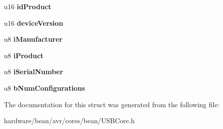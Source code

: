 \begin{DoxyCompactItemize}
\item 
\hypertarget{struct_device_descriptor_addd78b30e7cb9d2f475ba2374f3c9a89}{}u16 {\bfseries id\+Product}\label{struct_device_descriptor_addd78b30e7cb9d2f475ba2374f3c9a89}

\item 
\hypertarget{struct_device_descriptor_a87847fbbb755ff8925283cce07aec1c1}{}u16 {\bfseries device\+Version}\label{struct_device_descriptor_a87847fbbb755ff8925283cce07aec1c1}

\item 
\hypertarget{struct_device_descriptor_a4909c2fa6c9d6c5bed610ddf471d70d9}{}u8 {\bfseries i\+Manufacturer}\label{struct_device_descriptor_a4909c2fa6c9d6c5bed610ddf471d70d9}

\item 
\hypertarget{struct_device_descriptor_a0d731768bc1ff85b5ee29850616344ab}{}u8 {\bfseries i\+Product}\label{struct_device_descriptor_a0d731768bc1ff85b5ee29850616344ab}

\item 
\hypertarget{struct_device_descriptor_ae32967caa0dac5acf905110bfff7f303}{}u8 {\bfseries i\+Serial\+Number}\label{struct_device_descriptor_ae32967caa0dac5acf905110bfff7f303}

\item 
\hypertarget{struct_device_descriptor_ac308b68b577a10e3b5fd880b50c11288}{}u8 {\bfseries b\+Num\+Configurations}\label{struct_device_descriptor_ac308b68b577a10e3b5fd880b50c11288}

\end{DoxyCompactItemize}


The documentation for this struct was generated from the following file\+:\begin{DoxyCompactItemize}
\item 
hardware/bean/avr/cores/bean/U\+S\+B\+Core.\+h\end{DoxyCompactItemize}
